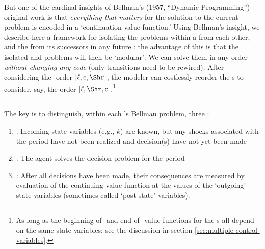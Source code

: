 \documentclass[titlepage, headings=optiontotocandhead]{econtex}
\begin{document}
But one of the cardinal insights of Bellman's (1957, ``Dynamic Programming'') original work is that \emph{everything that matters} for the solution to the current problem is encoded in a `continuation-value function.' %
Using Bellman's insight, we describe here a framework for isolating the {\stg} problems within a {\interval} from each other, and the {\interval} from its successors in any future {\interval}; the advantage of this is that the isolated {\stg} and {\interval} problems will then be `modular': We can solve them in any order \textit{without changing any code} (only transitions need to be rewired). After considering the {\stg}-order $[\ell,\mathrm{c},\Shr]$, the modeler can costlessly reorder the {\stg}s to consider, say, the order $[\ell,\Shr,\mathrm{c}]$.\footnote{As long as the beginning-of-{\stg} and end-of-{\stg} value functions for the {\stg}s all depend on the same state variables; see the discussion in section \ref{sec:multiple-control-variables}.}

\hypertarget{moves}{}
\subsection{\Moves}\label{subsec:steps}

The key is to distinguish, within each {\stg}'s Bellman problem, three {\moves}:

\begin{enumerate}
\item \textbf{\Arrival}: Incoming state variables (e.g., $k$) are known, but any shocks associated with the period have not been realized and decision(s) have not yet been made
\item \textbf{\Decision}: The agent solves the decision problem for the period
\item \textbf{\Continuation}: After all decisions have been made, their consequences are measured by evaluation of the continuing-value function at the values of the `outgoing' state variables (sometimes called `post-state' variables).
\end{enumerate}
\end{document}
